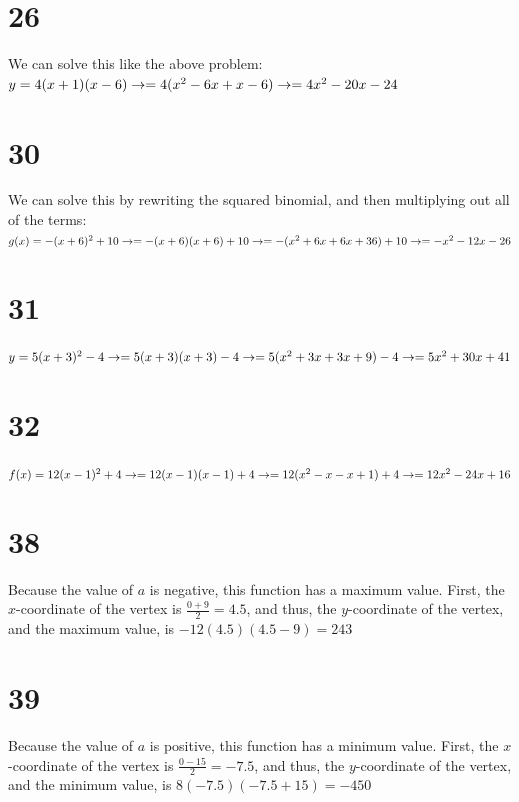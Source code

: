 \documentclass{article}
\theoremstyle{definition}
\begin{document}
\section*{26}
We can solve this like the above problem: \newline $y=4(x+1)(x-6)\newline\rightarrow =4(x^2-6x+x-6)\newline\rightarrow =4x^2-20x-24$

\section*{30}
We can solve this by rewriting the squared binomial, and then multiplying out all of the terms:\newline
$g(x)=-(x+6)^2+10\newline\rightarrow =-(x+6)(x+6)+10\newline\rightarrow =-(x^2+6x+6x+36)+10\newline\rightarrow =-x^2-12x-26$

\section*{31}
$y=5(x+3)^2-4\newline\rightarrow =5(x+3)(x+3)-4\newline\rightarrow =5(x^2+3x+3x+9)-4\newline\rightarrow =5x^2+30x+41$

\section*{32}
$f(x)=12(x-1)^2+4\newline\rightarrow =12(x-1)(x-1)+4\newline\rightarrow =12(x^2-x-x+1)+4\newline\rightarrow =12x^2-24x+16$

\section*{38}
Because the value of $a$ is negative, this function has a maximum value. First, the $x$-coordinate of the vertex is $\frac{0+9}{2}=4.5$, and thus, 
the $y$-coordinate of the vertex, and the maximum value, is $-12(4.5)(4.5-9)=243$

\section*{39}
Because the value of $a$ is positive, this function has a minimum value. First, the $x$-coordinate of the vertex is $\frac{0-15}{2}=-7.5$, and thus, 
the $y$-coordinate of the vertex, and the minimum value, is $8(-7.5)(-7.5+15)=-450$
\end{document}
